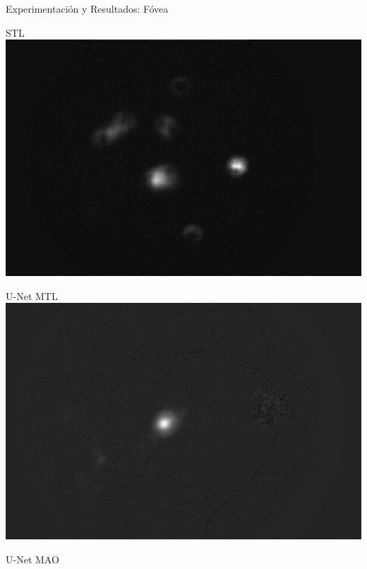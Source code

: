 \documentclass[xcolor=dvipsnames,table]{beamer}
\begin{document}
\begin{frame}{Experimentación y Resultados: Fóvea}
	\centering
	\begin{minipage}[b]{0.13\textwidth}
		\centering
		STL\\[0.2cm]
		\includegraphics[width=\linewidth]{my_images/video/FOVEASTL.jpg}
	\end{minipage}\hfill
	\begin{minipage}[b]{0.13\textwidth}
		\centering
		U-Net MTL\\[0.2cm]
		\includegraphics[width=\linewidth]{my_images/video/FOVEAUNETMTL.jpg}
	\end{minipage}\hfill
	\begin{minipage}[b]{0.13\textwidth}
		\centering
		U-Net MAO\\[0.2cm]

\end{minipage}
\end{frame}
\end{document}
